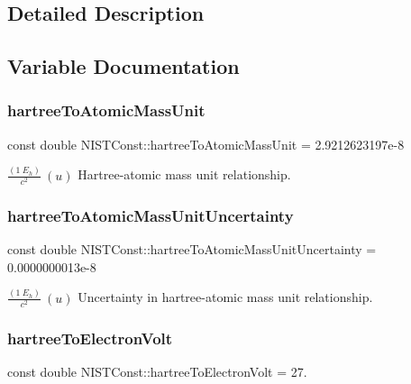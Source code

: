 \subsection{Detailed Description}


\subsection{Variable Documentation}
\mbox{\label{group___hartree_gafc823cd4d405fbad0af7abf03a28917d}} 
\subsubsection{\texorpdfstring{hartree\+To\+Atomic\+Mass\+Unit}{hartreeToAtomicMassUnit}}
{\footnotesize\ttfamily const double N\+I\+S\+T\+Const\+::hartree\+To\+Atomic\+Mass\+Unit = 2.\+9212623197e-\/8}

$\frac{(1\ E_h)}{c^2} \ (u)$ Hartree-\/atomic mass unit relationship. \mbox{\label{group___hartree_ga7be8625774a1b159233ac984e904cdb2}} 
\subsubsection{\texorpdfstring{hartree\+To\+Atomic\+Mass\+Unit\+Uncertainty}{hartreeToAtomicMassUnitUncertainty}}
{\footnotesize\ttfamily const double N\+I\+S\+T\+Const\+::hartree\+To\+Atomic\+Mass\+Unit\+Uncertainty = 0.\+0000000013e-\/8}

$\frac{(1\ E_h)}{c^2} \ (u)$ Uncertainty in hartree-\/atomic mass unit relationship. \mbox{\label{group___hartree_ga225406ee0c3f44db3c49563e7dd253ce}} 
\subsubsection{\texorpdfstring{hartree\+To\+Electron\+Volt}{hartreeToElectronVolt}}
{\footnotesize\ttfamily const double N\+I\+S\+T\+Const\+::hartree\+To\+Electron\+Volt = 27.}

